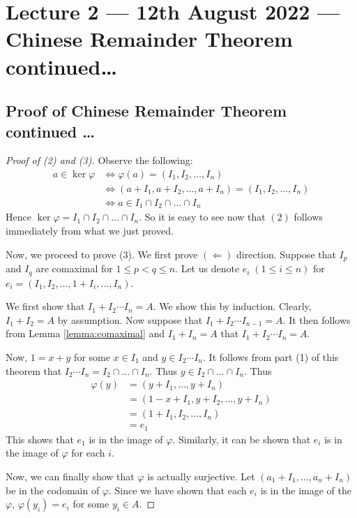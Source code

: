 \section{Lecture 2 --- 12th August 2022 --- Chinese Remainder Theorem continued\dots}
\subsection{Proof of Chinese Remainder Theorem continued \ldots}
\begin{proof}[Proof of (2) and (3)]
    Observe the following:
    \begin{align*}
	a\in \ker \varphi &\Longleftrightarrow \varphi (a)=\left( I_1 , I_2 , \ldots , I_n \right) \\
	&\Longleftrightarrow (a+I_1 , a+I_2 , \ldots , a+I_n) = \left( I_1 , I_2, \ldots , I_n \right)\\
&\Longleftrightarrow a\in I_1 \cap I_2 \cap \ldots \cap I_n
    \end{align*}
    Hence $\ker \varphi = I_1 \cap I_2 \cap \ldots \cap I_n$. So it is easy to see now that $(2)$ follows immediately from what we just proved.

    Now, we proceed to prove (3). We first prove $\left( \Leftarrow \right)$ direction. Suppose that $I_p$ and $I_q$ are comaximal for $1\le p  < q \le n$. Let us denote $e_i \; \left( 1\le i \le n \right)$ for $e_i = \left( I_1 , I_2 , \ldots , 1+I_i , \ldots , I_n \right)$.

    We first show that $I_1 + I_2\cdots I_n = A$. We show this by induction. Clearly, $I_1 + I_2 = A$ by assumption. Now suppose that $I_1 + I_2 \cdots I_{n-1} =A$. It then follows from Lemma \ref{lemma:comaximal} and $I_1 + I_n =A$ that $I_1 + I_2 \cdots I_n =A$.

    Now, $1=x+y$ for some $x\in I_1$ and $y\in I_2\cdots I_n$. It follows from part (1) of this theorem that $I_2 \cdots I_n = I_2 \cap \ldots \cap I_n$. Thus $y\in I_2 \cap \ldots \cap I_n$. Thus 
    \begin{align*}
	\varphi (y) &= \left( y+I_1, \ldots, y+ I_n \right)\\
	&= (1-x + I_1 , y+I_2 , \ldots , y+ I_n) \\
	&= (1+I_1 , I_2, \ldots, I_n) \\
	&= e_1
    \end{align*}
    This shows that $e_1$ is in the image of $\varphi$. Similarly, it can be shown that $e_i$ is in the image of $\varphi$ for each $i$.

    Now, we can finally show that $\varphi$ is actually surjective. Let $\left( a_1 + I_1 , \ldots, a_n + I_n \right)$ be in the codomain of $\varphi$. Since we have shown that each $e_i$ is in the image of the $\varphi$, $\varphi (y_i) = e_i$ for some $y_i \in A$.


\end{proof}
